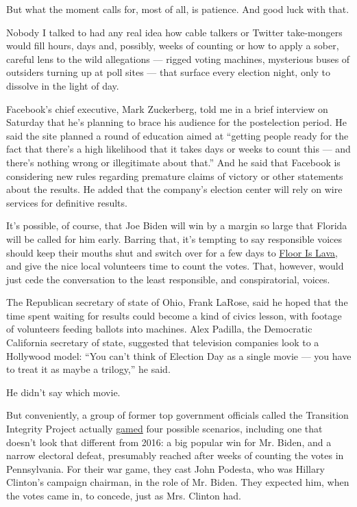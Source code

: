 But what the moment calls for, most of all, is patience. And good luck
with that.

Nobody I talked to had any real idea how cable talkers or Twitter
take-mongers would fill hours, days and, possibly, weeks of counting or
how to apply a sober, careful lens to the wild allegations --- rigged
voting machines, mysterious buses of outsiders turning up at poll sites
--- that surface every election night, only to dissolve in the light of
day.

Facebook's chief executive, Mark Zuckerberg, told me in a brief
interview on Saturday that he's planning to brace his audience for the
postelection period. He said the site planned a round of education aimed
at ``getting people ready for the fact that there's a high likelihood
that it takes days or weeks to count this --- and there's nothing wrong
or illegitimate about that.'' And he said that Facebook is considering
new rules regarding premature claims of victory or other statements
about the results. He added that the company's election center will rely
on wire services for definitive results.

It's possible, of course, that Joe Biden will win by a margin so large
that Florida will be called for him early. Barring that, it's tempting
to say responsible voices should keep their mouths shut and switch over
for a few days to
\href{https://www.youtube.com/watch?v=A3zkedeWbYw}{Floor Is Lava}, and
give the nice local volunteers time to count the votes. That, however,
would just cede the conversation to the least responsible, and
conspiratorial, voices.

The Republican secretary of state of Ohio, Frank LaRose, said he hoped
that the time spent waiting for results could become a kind of civics
lesson, with footage of volunteers feeding ballots into machines. Alex
Padilla, the Democratic California secretary of state, suggested that
television companies look to a Hollywood model: ``You can't think of
Election Day as a single movie --- you have to treat it as maybe a
trilogy,'' he said.

He didn't say which movie.

But conveniently, a group of former top government officials called the
Transition Integrity Project actually
\href{https://www.bostonglobe.com/2020/07/25/nation/bipartisan-group-secretly-gathered-game-out-contested-trump-biden-election-it-wasnt-pretty/}{gamed}
four possible scenarios, including one that doesn't look that different
from 2016: a big popular win for Mr. Biden, and a narrow electoral
defeat, presumably reached after weeks of counting the votes in
Pennsylvania. For their war game, they cast John Podesta, who was
Hillary Clinton's campaign chairman, in the role of Mr. Biden. They
expected him, when the votes came in, to concede, just as Mrs. Clinton
had.

